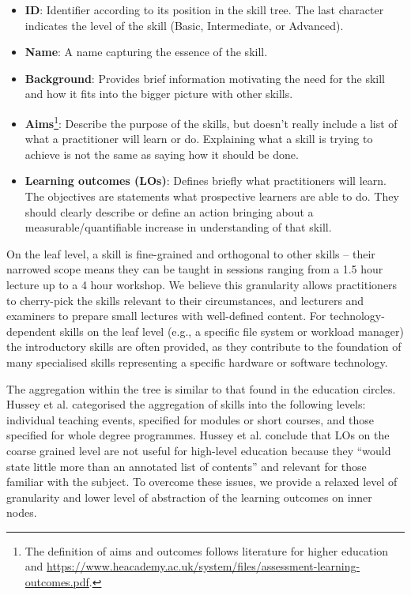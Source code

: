 \documentclass[jocse]{jocseart}
\begin{document}
\begin{itemize}
  \item \textbf{ID}: Identifier according to its position in the skill tree.
  The last character indicates the level of the skill (Basic, Intermediate, or Advanced).
  \item \textbf{Name}: A name capturing the essence of the skill.
  \item \textbf{Background}: Provides brief information motivating the need for the skill and how it fits into the bigger picture with other skills.
  \item \textbf{Aims}\footnote{The definition of aims and outcomes follows literature for higher education \cite{williamson2011good} and \url{https://www.heacademy.ac.uk/system/files/assessment-learning-outcomes.pdf}.}:
  Describe the purpose of the skills, but doesn't really include a list of what a practitioner will learn or do. Explaining what a skill is trying to achieve is not the same as saying how it should be done.
  \item \textbf{Learning outcomes (LOs)}: Defines briefly what practitioners will learn.
  The objectives are statements what prospective learners are able to do. They should clearly describe or define an action bringing about a measurable/quantifiable increase in understanding of that skill.
 \end{itemize}

On the leaf level, a skill is fine-grained and orthogonal to other skills -- their narrowed scope means they can be taught in sessions ranging from a 1.5 hour lecture up to a 4 hour workshop.
We believe this granularity allows practitioners to cherry-pick the skills relevant to their circumstances, and lecturers and examiners to prepare small lectures with well-defined content.
For technology-dependent skills on the leaf level (e.g., a specific file system or workload manager) the introductory skills are often provided, as they contribute to the foundation of many specialised skills representing a specific hardware or software technology.

The aggregation within the tree is similar to that found in the education circles.
Hussey et al.\cite{hussey2008learning} categorised the aggregation of skills into the following levels: individual teaching events, specified for modules or short courses, and those specified for whole degree programmes.
Hussey et al. conclude that LOs on the coarse grained level are not useful for high-level education because they “would state little more than an annotated list of contents” and relevant for those familiar with the subject.
To overcome these issues, we provide a relaxed level of granularity and lower level of abstraction of the learning outcomes on inner nodes.
\end{document}
